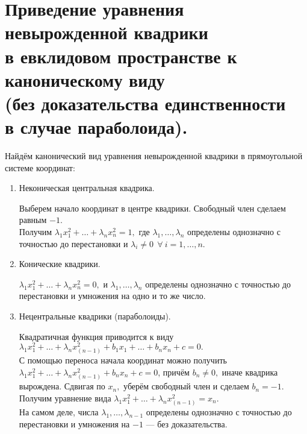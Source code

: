 \documentclass[draft]{article}%
\newcommand{\ab}{\par\noindent}%
\begin{document}
\section{Приведение уравнения невырожденной квадрики\\ в евклидовом пространстве к каноническому виду\\ (без
доказательства единственности\\ в случае параболоида).}
\label{q50}
Найдём канонический вид уравнения невырожденной квадрики в прямоугольной системе координат:
\begin{enumerate}
    \item Неконическая центральная квадрика.
    \ab Выберем начало координат в центре квадрики. Свободный член сделаем равным $-1$.\\
    Получим $\lambda_1x_1^2+\dots+\lambda_nx_n^2=1,$ где $\lambda_1,\dots,\lambda_n$ определены однозначно с
    точностью до перестановки и $\lambda_i\ne 0\ \ \forall\ i=1,\dots,n.$
    \item Конические квадрики.
    \ab $\lambda_1x_1^2+\dots+\lambda_nx_n^2=0,$ и $\lambda_1,\dots,\lambda_n$ определены однозначно с
    точностью до перестановки и умножения на одно и то же число.
    \item Нецентральные квадрики (параболоиды).
    \ab Квадратичная функция приводится к виду $\lambda_1x_1^2+\dots+\lambda_nx_(n-1)^2+b_1x_1+\dots+b_nx_n+c=0.$
    \\С помощью переноса начала координат можно получить $\lambda_1x_1^2+\dots+\lambda_nx_(n-1)^2+b_nx_n+c=0$, причём
    $b_n\ne 0,$ иначе квадрика вырождена. Сдвигая по $x_n,$ уберём свободный член и сделаем $b_n=-1.$ Получим уравнение
    вида $\lambda_1x_1^2+\dots+\lambda_nx_(n-1)^2=x_n.$\\ На самом деле, числа $\lambda_1,\dots,\lambda_{n-1}$ определены
    однозначно с точностью до перестановки и умножения на $-1$ --- без доказательства.
\end{enumerate}
\end{document}
